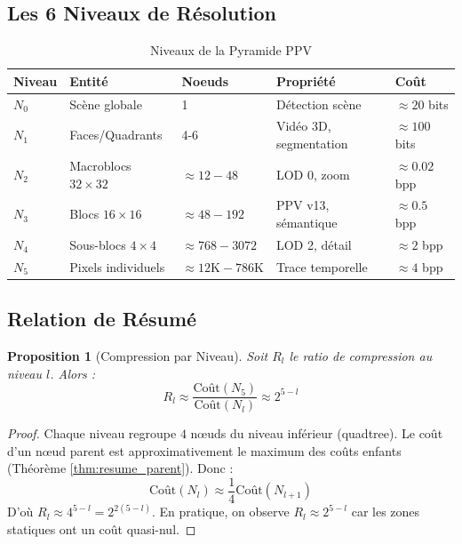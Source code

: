 \documentclass[12pt,a4paper]{article}
\newtheorem{proposition}[theorem]{Proposition}
\theoremstyle{definition}
\begin{document}
	\subsection{Les 6 Niveaux de Résolution}
	
	\begin{table}[h]
		\centering
		\caption{Niveaux de la Pyramide PPV}
		\label{tab:niveaux_pyramide}
		\begin{tabular}{@{}lllll@{}}
			\toprule
			\textbf{Niveau} & \textbf{Entité} & \textbf{Noeuds} & \textbf{Propriété} & \textbf{Coût} \\ \midrule
			$N_0$ & Scène globale & 1 & Détection scène & $\approx 20$ bits \\
			$N_1$ & Faces/Quadrants & 4-6 & Vidéo 3D, segmentation & $\approx 100$ bits \\
			$N_2$ & Macroblocs $32 \times 32$ & $\approx 12-48$ & LOD 0, zoom & $\approx 0.02$ bpp \\
			$N_3$ & Blocs $16 \times 16$ & $\approx 48-192$ & PPV v13, sémantique & $\approx 0.5$ bpp \\
			$N_4$ & Sous-blocs $4 \times 4$ & $\approx 768-3072$ & LOD 2, détail & $\approx 2$ bpp \\
			$N_5$ & Pixels individuels & $\approx 12\text{K}-786\text{K}$ & Trace temporelle & $\approx 4$ bpp \\
			\bottomrule
		\end{tabular}
	\end{table}
	
	\subsection{Relation de Résumé}
	
	\begin{proposition}[Compression par Niveau]
		\label{prop:compression_niveau}
		Soit $R_l$ le ratio de compression au niveau $l$. Alors :
		\begin{equation}
			R_l \approx \frac{\text{Coût}(N_5)}{\text{Coût}(N_l)} \approx 2^{5-l}
		\end{equation}
	\end{proposition}
	
	\begin{proof}
		Chaque niveau regroupe $4$ nœuds du niveau inférieur (quadtree). Le coût d'un nœud parent est approximativement le maximum des coûts enfants (Théorème \ref{thm:resume_parent}). Donc :
		\begin{equation}
			\text{Coût}(N_l) \approx \frac{1}{4} \text{Coût}(N_{l+1})
		\end{equation}
		D'où $R_l \approx 4^{5-l} = 2^{2(5-l)}$. En pratique, on observe $R_l \approx 2^{5-l}$ car les zones statiques ont un coût quasi-nul.
	\end{proof}
	
\end{document}
